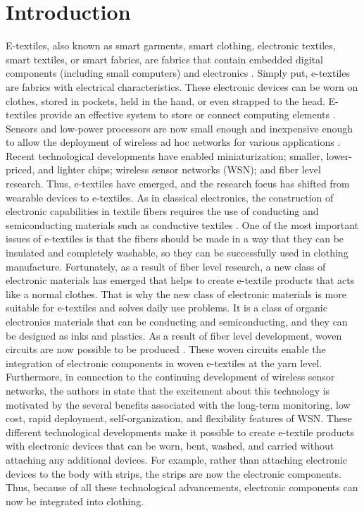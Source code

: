 \chapter{Introduction}
\label{chapter:Introduction}



	E-textiles, also known as smart garments, smart clothing, electronic textiles, smart textiles, or smart fabrics, are fabrics that contain embedded digital components (including small computers) and electronics \cite{1}. Simply put, e-textiles are fabrics with electrical characteristics. These electronic devices can be worn on clothes, stored in pockets, held in the hand, or even strapped to the head. E-textiles provide an effective system to store or connect computing elements \cite{12}. 
\\ 
Sensors and low-power processors are now small enough and inexpensive enough to allow the deployment of wireless ad hoc networks for various applications \cite{11}. Recent technological developments have enabled miniaturization; smaller, lower-priced, and lighter chips; wireless sensor networks (WSN); and fiber level research. Thus, e-textiles have emerged, and the research focus has shifted from wearable devices to e-textiles. As in classical electronics, the construction of electronic capabilities in textile fibers requires the use of conducting and semiconducting materials such as conductive textiles \cite{1}. One of the most important issues of e-textiles is that the fibers should be made in a way that they can be insulated and completely washable, so they can be successfully used in clothing manufacture. Fortunately, as a result of fiber level research, a new class of electronic materials has emerged that helps to create e-textile products that acts like a normal clothes. That is why the new class of electronic materials is more suitable for e-textiles and solves daily use problems. It is a class of organic electronics materials that can be conducting and semiconducting, and they can be designed as inks and plastics. As a result of fiber level development, woven circuits are now possible to be produced \cite{4}. These woven circuits enable the integration of electronic components in woven e-textiles at the yarn level. Furthermore, in connection to the continuing development of wireless sensor networks, the authors in \cite{9} state that the excitement about this technology is motivated by the several benefits associated with the long-term monitoring, low cost, rapid deployment, self-organization, and flexibility features of WSN. These different technological developments make it possible to create e-textile products with electronic devices that can be worn, bent, washed, and carried without attaching any additional devices. For example, rather than attaching electronic devices to the body with strips, the strips are now the electronic components. Thus, because of all these technological advancements, electronic components can now be integrated into clothing. 
